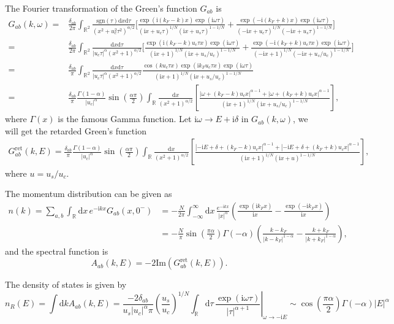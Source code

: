 \documentclass[10pt]{extarticle}
\newcommand{\ii}{\mathrm{i}}
\begin{document}
The Fourier transformation of the Green's function $G_{ab}$ is
\[
\begin{aligned}
	G_{ab}(k,\omega)=&\frac{\delta_{ab}}{2\pi}\int_{\mathbb{R}^2}\frac{\mathrm{sgn}(\tau)\mathrm{d}x\mathrm{d}\tau}{(x^2+u_c^2\tau^2)^{\alpha/2}}\biggl[\frac{\exp(\ii (k_F-k) x)\exp(\ii \omega\tau)}{(\ii x+u_c\tau)^{1/N}(\ii x+u_s\tau)^{1-1/N}}+\frac{\exp(-\ii (k_F+k) x)\exp(\ii \omega\tau)}{(-\ii x+u_c\tau)^{1/N}(-\ii x+u_s\tau)^{1-1/N}}\biggr]\\
	=&\frac{\delta_{ab}}{2\pi}\int_{\mathbb{R}^2}\frac{\mathrm{d}x\mathrm{d}\tau}{|u_c\tau|^{\alpha}(x^2+1)^{\alpha/2}}\biggl[\frac{\exp(\ii (k_F-k)u_c\tau x)\exp(\ii \omega\tau)}{(\ii x+1)^{1/N}(\ii x+u_s/u_c)^{1-1/N}}+\frac{\exp(-\ii (k_F+k)u_c\tau x)\exp(\ii \omega\tau)}{(-\ii x+1)^{1/N}(-\ii x+u_s/u_c)^{1-1/N}}\biggr]\\
	=&\frac{\delta_{ab}}{\pi}\int_{\mathbb{R}^2}\frac{\mathrm{d}x\mathrm{d}\tau}{|u_c\tau|^{\alpha}(x^2+1)^{\alpha/2}}\frac{\cos(ku_c\tau x)\exp(\ii k_Fu_c\tau x)\exp(\ii \omega\tau)}{(\ii x+1)^{1/N}(\ii x+u_s/u_c)^{1-1/N}}\\
	=&\frac{\delta_{ab}}{\pi}\frac{\Gamma(1-\alpha)}{|u_c|^\alpha}\sin\left(\frac{\alpha\pi}{2}\right)\int_{\mathbb{R}}\frac{\mathrm{d}x}{(x^2+1)^{\alpha/2}}\left[\frac{|\omega+(k_F-k)u_cx|^{\alpha-1}+|\omega+(k_F+k)u_cx|^{\alpha-1}}{(\ii x+1)^{1/N}(\ii x+u_s/u_c)^{1-1/N}}\right],
\end{aligned}
\]
where $\Gamma(x)$ is the famous Gamma function. Let $\ii\omega\to E+\ii\delta$ in $G_{ab}(k,\omega)$, we will get the retarded Green's function
\[
\begin{aligned}
	G^{\text{ret}}_{ab}(k,E)=\frac{\delta_{ab}}{\pi}\frac{\Gamma(1-\alpha)}{|u_c|^\alpha}\sin\left(\frac{\alpha\pi}{2}\right)\int_{\mathbb{R}}\frac{\mathrm{d}x}{(x^2+1)^{\alpha/2}}\left[\frac{|-\ii E+\delta+(k_F-k)u_cx|^{\alpha-1}+|-\ii E+\delta+(k_F+k)u_cx|^{\alpha-1}}{(\ii x+1)^{1/N}(\ii x+u)^{1-1/N}}\right],
\end{aligned}
\]
where $u=u_s/u_c$.

The momentum distribution can be given as
\[
\begin{aligned}
	n(k)=\sum_{a,b}\int_\mathbb{R} \mathrm{d}x\, e^{-\ii kx}G_{ab}(x,0^-)&=-\frac{N}{2\pi} \int_{-\infty}^\infty \mathrm{d}x\,\frac{e^{-\ii kx}}{|x|^\alpha}\left(\frac{\exp(\ii k_F x)}{\ii x}-\frac{\exp(-\ii k_F x)}{\ii x}\right)\\
	&=-\frac{N}{\pi}\sin \left(\frac{\pi  \alpha }{2}\right) \Gamma (-\alpha ) \left(\frac{k-k_F}{\left| k-k_F\right| ^{1-\alpha}}-\frac{k+k_F}{\left| k+k_F\right| ^{1-\alpha}}\right),
\end{aligned}
\]
and the spectral function is 
\[
	A_{ab}(k,E)=-2\mathrm{Im} \left(G^{\text{ret}}_{ab}(k,E)\right).
\]

The density of states is given by
\[
	n_R(E)=\int \mathrm{d}k A_{ab}(k,E)=\frac{-2\delta_{ab}}{u_s|u_c|^{\alpha}\pi}\left(\frac{u_s}{u_c}\right)^{1/N}\left.\int_{\mathbb{R}}\mathrm{d}\tau\,\frac{\exp(\ii \omega\tau)}{|\tau|^{\alpha+1}}\right|_{\omega\to -\ii E}\sim \cos \left(\frac{\pi \alpha}{2}\right) \Gamma (-\alpha) \left| E\right|^\alpha
\]
\end{document}
